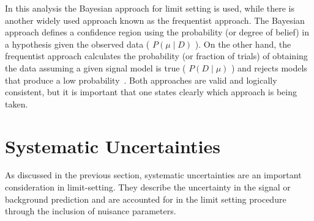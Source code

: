 In this analysis the Bayesian approach for limit setting is used,
while there is another widely used approach known as the frequentist approach.
The Bayesian approach defines a confidence region using the probability (or degree of belief) in a hypothesis given the observed data ( $P(\mu \mid D)$ ).
On the other hand, the frequentist approach calculates the probability (or fraction of trials)
of obtaining the data assuming a given signal model is true ( $P(D \mid \mu)$ ) and rejects models that produce a low probability~\cite{lim-cowan}.
Both approaches are valid and logically consistent,
but it is important that one states clearly which approach is being taken.

\section{Systematic Uncertainties}
\label{sec:lim-syst}

As discussed in the previous section,
systematic uncertainties are an important consideration in limit-setting.
They describe the uncertainty in the signal or background prediction
and are accounted for in the limit setting procedure through the inclusion of nuisance parameters.

